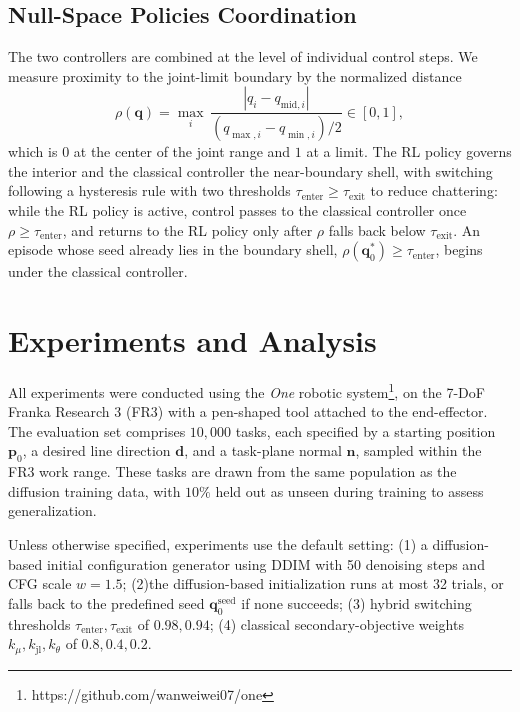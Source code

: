 \documentclass{svproc}
\newcommand{\rev}[1]{\begingroup\color{magenta}#1\endgroup}
\begin{document}
\subsection{Null-Space Policies Coordination}\label{sec:coordination}
The two controllers are combined at the level of individual control steps. We measure proximity to the joint-limit boundary by the normalized distance
\begin{equation}
\label{eq:rho}
\rho(\mathbf{q}) = \max_{i}\,\frac{|q_{i}-q_{\mathrm{mid},i}|}{(q_{\max,i}-q_{\min,i})/2}\in[0,1],
\end{equation}
which is $0$ at the center of the joint range and $1$ at a limit. The RL policy governs the interior and the classical controller the near-boundary shell, with switching following a hysteresis rule with two thresholds $\tau_{\mathrm{enter}}\ge\tau_{\mathrm{exit}}$ to reduce chattering: while the RL policy is active, control passes to the classical controller once $\rho\ge\tau_{\mathrm{enter}}$, and returns to the RL policy only after $\rho$ falls back below $\tau_{\mathrm{exit}}$. An episode whose seed already lies in the boundary shell, $\rho(\mathbf{q}_{0}^{*})\ge\tau_{\mathrm{enter}}$, begins under the classical controller.

\section{Experiments and Analysis}
\rev{\label{sec:exp}}
All experiments were conducted using the \textit{One} robotic system\footnote{https://github.com/wanweiwei07/one}, on the 7-DoF Franka Research 3 (FR3) with a pen-shaped tool attached to the end-effector. The evaluation set comprises $10{,}000$ tasks, each specified by a starting position $\mathbf{p}_0$, a desired line direction $\mathbf{d}$, and a task-plane normal $\mathbf{n}$, sampled within the FR3 work range. These tasks are drawn from the same population as the diffusion training data, with $10\%$ held out as unseen during training to assess generalization.

Unless otherwise specified, experiments use the default setting: (1) a diffusion-based initial configuration generator using DDIM with 50 denoising steps and CFG scale $w=1.5$; (2)the diffusion-based initialization runs at most 32 trials, or falls back to the predefined seed $\mathbf{q}_0^{\mathrm{seed}}$ if none succeeds; (3) hybrid switching thresholds $\tau_{\mathrm{enter}},\tau_{\mathrm{exit}}$ of $0.98,0.94$; (4) classical secondary-objective weights $k_{\mu},k_{\mathrm{jl}},k_{\theta}$ of $0.8,0.4,0.2$.
\end{document}
